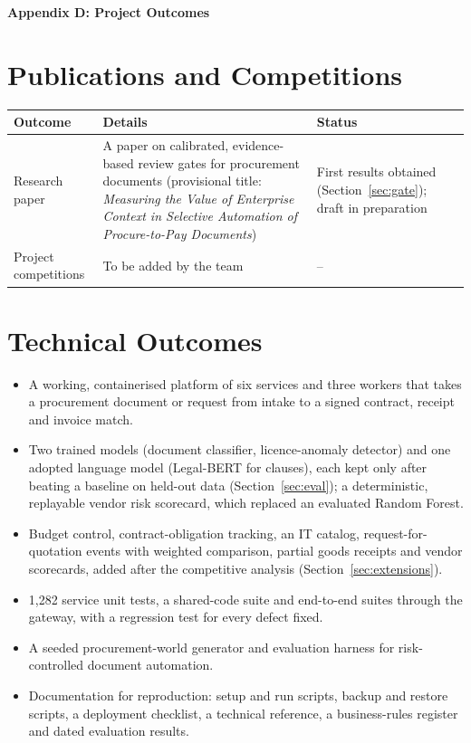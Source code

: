 
\vspace*{5cm}
\begin{centering}
{\LARGE\bfseries Appendix D: Project Outcomes}\\
\end{centering}

\newpage

\section*{Publications and Competitions}
\begin{center}
\tablestyle
\begin{tabularx}{\textwidth}{|L{0.22\textwidth}|Y|L{0.18\textwidth}|}
\hline
\textbf{Outcome} & \textbf{Details} & \textbf{Status} \\ \hline
Research paper & A paper on calibrated, evidence-based review gates for procurement documents (provisional title: \emph{Measuring the Value of Enterprise Context in Selective Automation of Procure-to-Pay Documents}) & First results obtained (Section~\ref{sec:gate}); draft in preparation \\ \hline
Project competitions & To be added by the team & -- \\ \hline
\end{tabularx}
\end{center}

\section*{Technical Outcomes}
\begin{itemize}
  \item A working, containerised platform of six services and three workers that takes a procurement document or request from intake to a signed contract, receipt and invoice match.
  \item Two trained models (document classifier, licence-anomaly detector) and one adopted language model (Legal-BERT for clauses), each kept only after beating a baseline on held-out data (Section~\ref{sec:eval}); a deterministic, replayable vendor risk scorecard, which replaced an evaluated Random Forest.
  \item Budget control, contract-obligation tracking, an IT catalog, request-for-quotation events with weighted comparison, partial goods receipts and vendor scorecards, added after the competitive analysis (Section~\ref{sec:extensions}).
  \item 1,282 service unit tests, a shared-code suite and end-to-end suites through the gateway, with a regression test for every defect fixed.
  \item A seeded procurement-world generator and evaluation harness for risk-controlled document automation.
  \item Documentation for reproduction: setup and run scripts, backup and restore scripts, a deployment checklist, a technical reference, a business-rules register and dated evaluation results.
\end{itemize}
